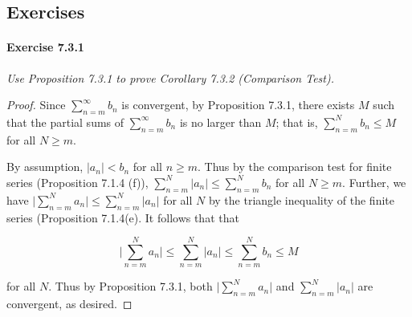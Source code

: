 \documentclass{article}
\begin{document}
\subsection*{Exercises}
\paragraph{Exercise 7.3.1} \textit{Use Proposition 7.3.1 to prove Corollary 7.3.2 (Comparison Test).}

\begin{proof} Since $\sum_{n=m}^\infty b_n$ is convergent, by Proposition 7.3.1, there exists $M$ such that the partial sums of $\sum_{n=m}^\infty b_n$ is no larger than $M$; that is, $\sum_{n=m}^N b_n \leq M$ for all $N \geq m$.

By assumption, $|a_n| < b_n$ for all $n \geq m$. Thus by the comparison test for finite series (Proposition 7.1.4 (f)), $\sum_{n=m}^N  | a_n | \leq \sum_{n=m}^N  b_n $ for all $N \geq m$. Further, we have $\big | \sum_{n=m}^N a_n \big | \leq \sum_{n=m}^N  | a_n |$ for all $N$ by the triangle inequality of the finite series (Proposition 7.1.4(e). It follows that that 

\[ \big | \sum_{n=m}^N a_n \big | \leq  \sum_{n=m}^N  | a_n | \leq \sum_{n=m}^N b_n \leq M \]

for all $N$. Thus by Proposition 7.3.1, both $\big | \sum_{n=m}^N a_n \big |$ and $\sum_{n=m}^N  | a_n |$ are convergent, as desired.
\end{proof}


\end{document}
